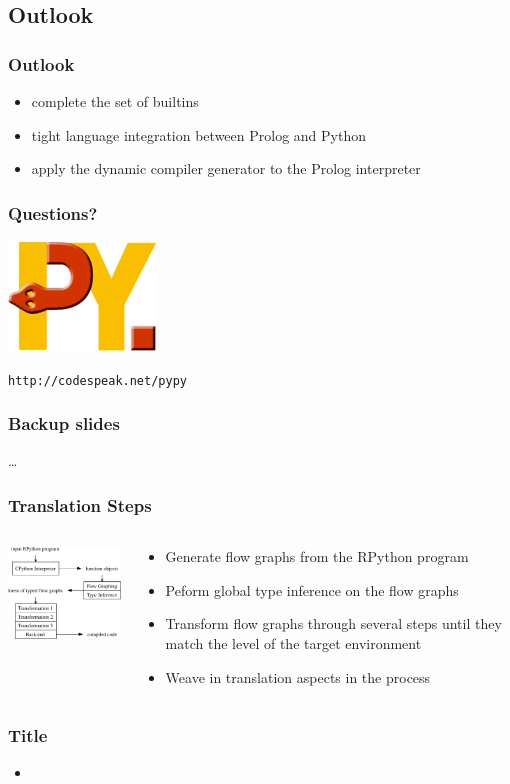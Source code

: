 \documentclass[utf8]{beamer}
\begin{document}
\subsection*{Outlook}
\begin{frame}
  \frametitle{Outlook}
  \begin{itemize}
  \item
    complete the set of builtins
  \item
    tight language integration between Prolog and Python
  \item
    apply the dynamic compiler generator to the Prolog interpreter
  \end{itemize}
\end{frame}

\begin{frame}
  \frametitle{Questions?}
  \begin{center}
  \includegraphics[scale=0.5]{image/py-web.png}
  
  \texttt{http://codespeak.net/pypy}
  \end{center}
\end{frame}


\begin{frame}
  \frametitle{Backup slides}
  \dots
\end{frame}

\begin{frame}
  \frametitle{Translation Steps}
  \begin{columns}[c]
  \begin{column}{5cm}
    \includegraphics[width=5cm]{image/arch.pdf}
  \end{column}
  \begin{column}{7cm}
  \begin{itemize}
    \item
      Generate flow graphs from the RPython program
    \item
      Peform global type inference on the flow graphs
    \item
      Transform flow graphs through several steps until they match the level of
      the target environment
    \item
      Weave in translation aspects in the process
  \end{itemize}
  \end{column}
  \end{columns}
\end{frame}

\begin{frame}
  \frametitle{Title}
  \begin{itemize}
  \item
  \end{itemize}
\end{frame}
\end{document}
